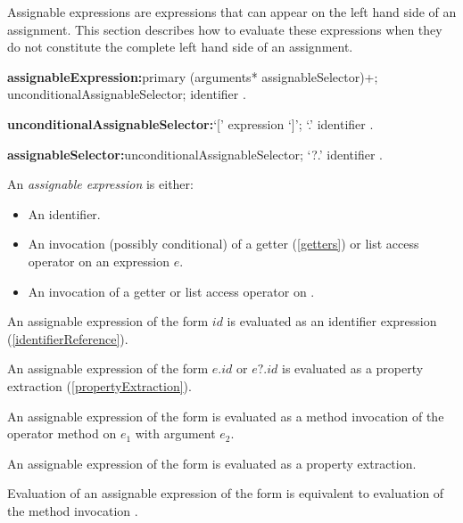 \documentclass{article}
\begin{document}
\LMHash{}
Assignable expressions are expressions that can appear on the left hand side of an assignment.
This section describes how to evaluate these expressions when they do not constitute the complete left hand side of an assignment.


\begin{grammar}
{\bf assignableExpression:}primary (arguments* assignableSelector)+;
  \SUPER{} unconditionalAssignableSelector;
  identifier
  .

{\bf unconditionalAssignableSelector:}`[' expression `]';
  `{\escapegrammar .}' identifier
  .

{\bf assignableSelector:}unconditionalAssignableSelector;
  `{\escapegrammar ?.}' identifier
  .
\end{grammar}

\LMHash{}
An {\em assignable expression} is either:
\begin{itemize}
\item An identifier.
\item An invocation (possibly conditional) of a getter (\ref{getters}) or list access operator on an expression $e$.
\item An invocation of a getter or list access operator on \SUPER{}.
\end{itemize}

\LMHash{}
An assignable expression of the form $id$ is evaluated as an identifier expression (\ref{identifierReference}).


\LMHash{}
An assignable expression of the form $e.id$ or $e?.id$ is evaluated as a property extraction (\ref{propertyExtraction}).

\LMHash{}
An assignable expression of the form  is evaluated as a method invocation of the operator method \code{[]} on $e_1$ with argument $e_2$.

\LMHash{}
An assignable expression of the form  is evaluated as a property extraction.

\LMHash{}
Evaluation of an assignable expression of the form \code{\SUPER{}[$e_2$]} is equivalent to evaluation of the method invocation .
\end{document}
